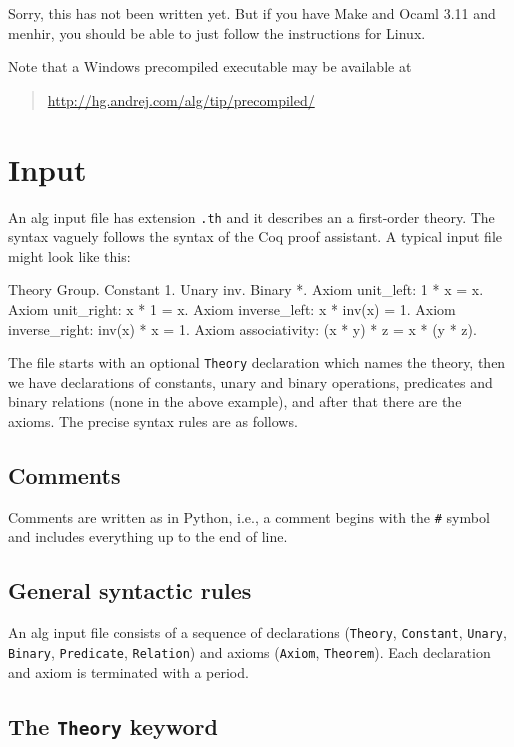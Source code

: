 \documentclass{article}
\begin{document}
Sorry, this has not been written yet. But if you have Make and Ocaml
3.11 and menhir, you should be able to just follow the instructions
for Linux.

Note that a Windows precompiled executable may be available at
%
\begin{quote}
  \url{http://hg.andrej.com/alg/tip/precompiled/}
\end{quote}

\section{Input}
\label{sec:input}

An alg input file has extension \texttt{.th} and it describes an a
first-order theory. The syntax vaguely follows the syntax of the Coq
proof assistant. A typical input file might look like this:
%
\begin{source}
Theory Group.
Constant 1.
Unary inv.
Binary *.
Axiom unit_left: 1 * x = x.
Axiom unit_right: x * 1 = x.
Axiom inverse_left: x * inv(x) = 1.
Axiom inverse_right: inv(x) * x = 1.
Axiom associativity: (x * y) * z = x * (y * z).
\end{source}
%
The file starts with an optional \texttt{Theory} declaration which
names the theory, then we have declarations of constants, unary and
binary operations, predicates and binary relations (none in the above
example), and after that there are the axioms. The precise syntax
rules are as follows.

\subsection{Comments}

Comments are written as in Python, i.e., a comment begins with the
\texttt{\#} symbol and includes everything up to the end of line.

\subsection{General syntactic rules}

An alg input file consists of a sequence of declarations
(\texttt{Theory}, \texttt{Constant}, \texttt{Unary}, \texttt{Binary},
\texttt{Predicate}, \texttt{Relation}) and axioms (\texttt{Axiom},
\texttt{Theorem}). Each declaration and axiom is terminated with a
period.

\subsection{The \texttt{Theory} keyword}
\end{document}
